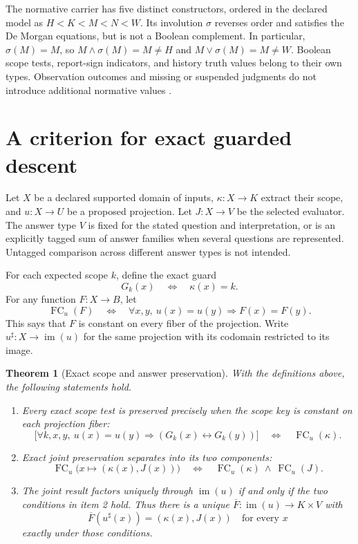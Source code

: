 \documentclass[11pt]{article}
\newtheorem{theorem}{Theorem}
\newcommand{\FC}{\operatorname{FC}}
\newcommand{\im}{\operatorname{im}}
\begin{document}
The normative carrier has five distinct constructors, ordered in the declared model as \(H<K<M<N<W\). Its involution \(\sigma\) reverses order and satisfies the De Morgan equations, but is not a Boolean complement. In particular, \(\sigma(M)=M\), so \(M\wedge\sigma(M)=M\ne H\) and \(M\vee\sigma(M)=M\ne W\). Boolean scope tests, report-sign indicators, and history truth values belong to their own types. Observation outcomes and missing or suspended judgments do not introduce additional normative values \cite{core,projection}.

\section{A criterion for exact guarded descent}

Let \(X\) be a declared supported domain of inputs, \(\kappa:X\to K\) extract their scope, and \(u:X\to U\) be a proposed projection. Let \(J:X\to V\) be the selected evaluator. The answer type \(V\) is fixed for the stated question and interpretation, or is an explicitly tagged sum of answer families when several questions are represented. Untagged comparison across different answer types is not intended.

For each expected scope \(k\), define the exact guard
\[
 G_k(x)\quad\Longleftrightarrow\quad\kappa(x)=k.
\]
For any function \(F:X\to B\), let
\[
 \FC_u(F)\quad\Longleftrightarrow\quad
 \forall x,y,\ u(x)=u(y)\Longrightarrow F(x)=F(y).
\]
This says that \(F\) is constant on every fiber of the projection. Write
\(u^\sharp:X\to\im(u)\) for the same projection with its codomain restricted to its image.

\begin{theorem}[Exact scope and answer preservation]\label{thm:criterion}
With the definitions above, the following statements hold.
\begin{enumerate}
\item Every exact scope test is preserved precisely when the scope key is constant on each projection fiber:
\[
 \bigl[\forall k,x,y,\ u(x)=u(y)\Rightarrow
       (G_k(x)\leftrightarrow G_k(y))\bigr]
 \quad\Longleftrightarrow\quad \FC_u(\kappa).
\]
\item Exact joint preservation separates into its two components:
\[
 \FC_u\bigl(x\mapsto(\kappa(x),J(x))\bigr)
 \quad\Longleftrightarrow\quad
 \FC_u(\kappa)\ \land\ \FC_u(J).
\]
\item The joint result factors uniquely through \(\im(u)\) if and only if the two conditions in item 2 hold. Thus there is a unique
\(\overline F:\im(u)\to K\times V\) with
\[
 \overline F(u^\sharp(x))=(\kappa(x),J(x))
 \quad\text{for every }x
\]
exactly under those conditions.
\end{enumerate}
\end{theorem}
\end{document}
